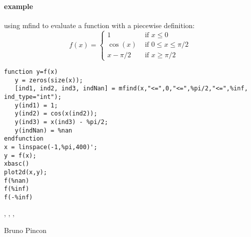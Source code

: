 \begin{examples}
  
\paragraph{example}
using mfind to evaluate a function with a piecewise definition: 
$$
f(x) = \left\{ \begin{array}{ll}
    1     & \mbox{ if } x \le 0 \\
  \cos(x) & \mbox{ if } 0 \le x \le \pi/2 \\
  x-\pi/2 & \mbox{ if } x \ge  \pi/2 
\end{array}\right.
$$
\begin{Verbatim}
function y=f(x) 
   y = zeros(size(x)); 
   [ind1, ind2, ind3, indNan] = mfind(x,"<=",0,"<=",%pi/2,"<=",%inf, ind_type="int"); 
   y(ind1) = 1; 
   y(ind2) = cos(x(ind2)); 
   y(ind3) = x(ind3) - %pi/2; 
   y(indNan) = %nan 
endfunction 
x = linspace(-1,%pi,400)'; 
y = f(x); 
xbasc()
plot2d(x,y); 
f(%nan) 
f(%inf) 
f(-%inf) 
\end{Verbatim}

 
\end{examples}

\begin{manseealso}
   , , , 
\end{manseealso}

\begin{authors}
  Bruno Pincon
\end{authors}
